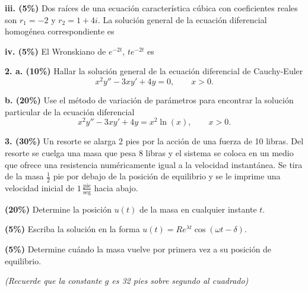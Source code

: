 \documentclass[11pt]{article}
\begin{document}
\vspace{0.3cm}
\noindent\textbf{iii. (5\%)} Dos raíces de una ecuación característica cúbica con coeficientes reales son $r_1=-2$ y $r_2=1+4i$. La solución general de la ecuación diferencial homogénea correspondiente es

\underline{\hspace{7cm}}

\vspace{0.3cm}
\noindent\textbf{iv. (5\%)} El Wronskiano de $e^{-2t}$, $te^{-2t}$ es \underline{\hspace{4cm}}

\newpage

\noindent\textbf{2. a. (10\%)} Hallar la solución general de la ecuación diferencial de Cauchy-Euler
\[
x^2y''-3xy'+4y=0, \qquad x>0.
\]

\vspace{4cm}

\noindent\textbf{b. (20\%)} Use el método de variación de parámetros para encontrar la solución particular de la ecuación diferencial
\[
x^2y''-3xy'+4y=x^2\ln(x), \qquad x>0.
\]

\vspace{9cm}

\newpage

\noindent\textbf{3. (30\%)} Un resorte se alarga 2 pies por la acción de una fuerza de 10 libras. Del resorte se cuelga una masa que pesa 8 libras y el sistema se coloca en un medio que ofrece una resistencia numéricamente igual a la velocidad instantánea. Se tira de la masa $\frac{1}{2}$ pie por debajo de la posición de equilibrio y se le imprime una velocidad inicial de $1\,\frac{\text{pie}}{\text{seg}}$ hacia abajo.

\begin{opciones}
\item[a.] \textbf{(20\%)} Determine la posición $u(t)$ de la masa en cualquier instante $t$.
\item[b.] \textbf{(5\%)} Escriba la solución en la forma $u(t)=Re^{\lambda t}\cos(\omega t-\delta)$.
\item[c.] \textbf{(5\%)} Determine cuándo la masa vuelve por primera vez a su posición de equilibrio.
\end{opciones}

\textit{(Recuerde que la constante $g$ es 32 pies sobre segundo al cuadrado)}

\vspace{9cm}

\newpage
\end{document}
